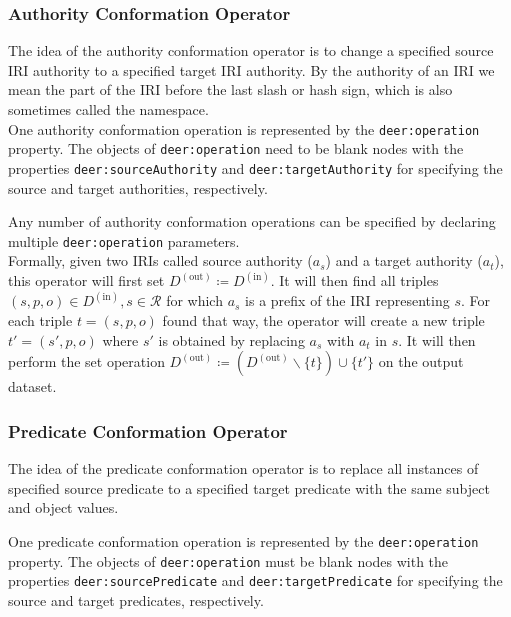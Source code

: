 
\subsubsection*{Authority Conformation Operator}

The idea of the authority conformation operator is to change a specified source \ac{IRI} authority to a specified target \ac{IRI} authority.
By the authority of an \ac{IRI} we mean the part of the \ac{IRI} before the last slash or hash sign, which is also sometimes called the namespace.\\

One authority conformation operation is represented by the \texttt{deer:operation} property. The objects of \texttt{deer:operation} need to be blank nodes with the properties \texttt{deer:sourceAuthority} and \texttt{deer:targetAuthority} for specifying the source and target authorities, respectively.

Any number of authority conformation operations can be specified by declaring multiple \texttt{deer:operation} parameters. \\

Formally, given two \acp{IRI} called source authority ($a_s$) and a target authority ($a_t$), this operator will first set $D^{(\text{out})}\coloneq D^{(\text{in})}$.
It will then find all triples $(s,p,o)\in D^{(\text{in})}, s\in \mathcal{R}$ for which $a_s$ is a prefix of the \ac{IRI} representing $s$.
For each triple $t=(s,p,o)$ found that way, the operator will create a new triple $t'=(s',p,o)$ where $s'$ is obtained by replacing $a_s$ with $a_t$ in $s$.
It will then perform the set operation $D^{(\text{out})}\coloneq (D^{(\text{out})}\backslash\{t\})\cup\{t'\}$ on the output dataset.

\subsubsection*{Predicate Conformation Operator}

The idea of the predicate conformation operator is to replace all instances of specified source predicate to a specified target predicate with the same subject and object values.

One predicate conformation operation is represented by the \texttt{deer:operation} property.
The objects of \texttt{deer:operation} must be blank nodes with the properties \texttt{deer:sourcePredicate} and \texttt{deer:targetPredicate} for specifying the source and target predicates, respectively.

